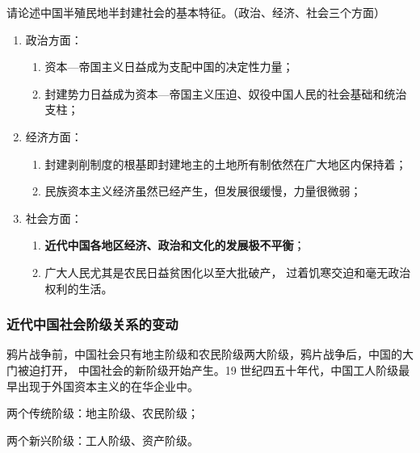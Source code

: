 \documentclass[10pt, UTF8]{book} %
\begin{document}
\begin{mdframed}
    \begin{thm}
        请论述中国半殖民地半封建社会的基本特征。（政治、经济、社会三个方面）
    \end{thm}
    \begin{enumerate}[label=(\arabic*), itemsep=0pt]
        \item 政治方面：
        \begin{enumerate}[label=$\textup{\alph*}$., itemsep=0pt]
            \item 资本—帝国主义日益成为支配中国的决定性力量；
            \item 封建势力日益成为资本—帝国主义压迫、奴役中国人民的社会基础和统治支柱；
        \end{enumerate}
        \item 经济方面：
        \begin{enumerate}[label=$\textup{\alph*}$., itemsep=0pt]
            \item 封建剥削制度的根基即封建地主的土地所有制依然在广大地区内保持着；
            \item 民族资本主义经济虽然已经产生，但发展很缓慢，力量很微弱；
        \end{enumerate}
        \item 社会方面：
        \begin{enumerate}[label=$\textup{\alph*}$., itemsep=0pt]
            \item \textbf{近代中国各地区经济、政治和文化的发展极不平衡}；
            \item 广大人民尤其是农民日益贫困化以至大批破产，
            过着饥寒交迫和毫无政治权利的生活。
        \end{enumerate}
    \end{enumerate}
\end{mdframed}

\subsubsection{近代中国社会阶级关系的变动}

鸦片战争前，中国社会只有地主阶级和农民阶级两大阶级，鸦片战争后，中国的大门被迫打开，
中国社会的新阶级开始产生。19 世纪四五十年代，中国工人阶级最早出现于外国资本主义的在华企业中。

两个传统阶级：地主阶级、农民阶级；

两个新兴阶级：工人阶级、资产阶级。

\end{document}
